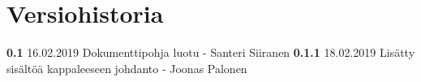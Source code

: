 \chapter*{Versiohistoria}

\newcommand{\currentversion}{0.1.1} %

\textbf{0.1} 16.02.2019 Dokumenttipohja luotu - Santeri Siiranen
\textbf{0.1.1} 18.02.2019 Lisätty sisältöä kappaleeseen johdanto - Joonas Palonen
